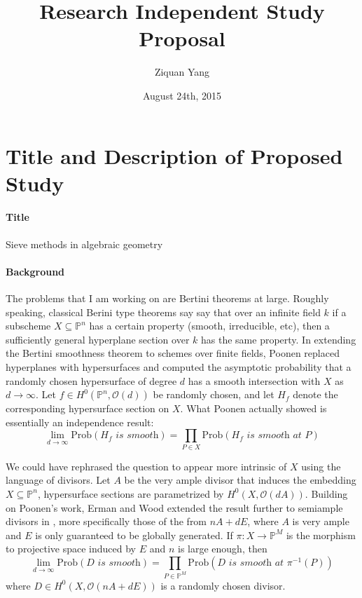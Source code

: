 \documentclass[12pt]{article}
\theoremstyle{plain}
\theoremstyle{definition}
\newcommand{\IP}{\mathbb{P}}
\newcommand{\sO}{\mathcal{O}}
\newcommand{\<}{\langle}
\renewcommand{\>}{\rangle}
\begin{document}
%

\title{Research Independent Study Proposal}
\author{Ziquan Yang}


\date{August 24th, 2015}

\maketitle


 

\setcounter{section}{0}
\section{Title and Description of Proposed Study}
\paragraph{Title} Sieve methods in algebraic geometry
\paragraph{Background}
The problems that I am working on are Bertini theorems at large. Roughly speaking, classical Berini type theorems say say that over an infinite field $k$ if a subscheme $X \subseteq \IP^n$ has a certain property (smooth, irreducible, etc), then a sufficiently general hyperplane section over $k$ has the same property. In extending the Bertini smoothness theorem to schemes over finite fields, Poonen \cite{PBertini} replaced hyperplanes with hypersurfaces and computed the asymptotic probability that a randomly chosen hypersurface of degree $d$ has a smooth intersection with $X$ as $d \to \infty$. Let $f \in H^0(\IP^n, \sO(d))$ be randomly chosen, and let $H_f$ denote the corresponding hypersurface section on $X$. What Poonen actually showed is essentially an independence result:
$$ \lim_{d \to \infty} \mathrm{Prob}(H_f \textit{ is smooth}) = \prod_{P \in X} \mathrm{Prob}(H_f \textit{ is smooth at  }P)$$ 

We could have rephrased the question to appear more intrinsic of $X$ using the language of divisors. Let $A$ be the very ample divisor that induces the embedding $X \subseteq \IP^n$, hypersurface sections are parametrized by $H^0(X, \sO(dA))$. Building on Poonen's work, Erman and Wood extended the result further to semiample divisors in \cite{Wood}, more specifically those of the from $nA + dE$, where $A$ is very ample and $E$ is only guaranteed to be globally generated. If $\pi : X \to \IP^M$ is the morphism to projective space induced by $E$ and $n$ is large enough, then 
$$ \lim_{d \to \infty} \mathrm{Prob}(D \textit{ is smooth}) = \prod_{P \in \IP^M} \mathrm{Prob}(D \textit{ is smooth at  }\pi^{-1}(P))$$  
where $D \in H^0(X, \sO(nA + dE))$ is a randomly chosen divisor.
\end{document}
